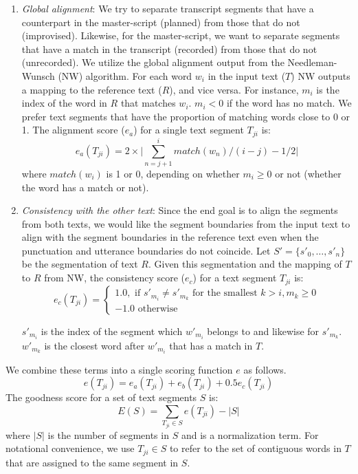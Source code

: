 \begin{enumerate}
\item{\textit{Global alignment}: We try to separate transcript segments that have a counterpart in the master-script (planned) from those that do not (improvised). Likewise, for the master-script, we want to separate segments that have a match in the transcript (recorded) from those that do not (unrecorded). We utilize the global alignment output from the Needleman-Wunsch (NW) algorithm. For each word $w_i$ in the input text ($T$) NW outputs a mapping 
to the reference text ($R$), and vice versa. For instance, $m_i$ is the index of the word in  $R$ that matches $w_i$. $m_i < 0$ if the word has no match. We prefer text segments that have the proportion of matching words close to 0 or 1. The alignment score ($e_a$) for a single text segment $T_{ji}$ is:  
\begin{equation}
e_{a}(T_{ji}) = 2\times\bigg|\sum_{n=j+1}^{i}{match(w_n)}\big/(i-j) - 1/2 \bigg|
\end{equation}
where $match(w_i)$ is 1 or 0, depending on whether $m_i \geq 0$ or not (whether the word has a match or not).
}
\item{\textit{Consistency with the other text}: Since the end goal is to align the segments from both texts, we would like the segment boundaries from the input text to align with the segment boundaries in the reference text even when the punctuation and utterance boundaries do not coincide. Let $S' = \{s'_0, \dots, s'_n\}$ be the segmentation of text $R$. Given this segmentation and the mapping of $T$ to $R$ from NW, the consistency score ($e_c$) for a text segment $T_{ji}$ is:
\begin{equation}
    e_c(T_{ji})= 
\begin{cases}
   1.0, \text{ if } s'_{m_i} \neq s'_{m_k} \text{ for the smallest } k>i, m_k \geq0\\
   -1.0 \text{ otherwise }
\end{cases}
\end{equation}

$s'_{m_i}$ is the index of the segment which $w'_{m_i}$ belongs to and likewise for $s'_{m_k}$. $w'_{m_k}$ is the closest word after $w'_{m_i}$ that has a match in $T$.
} 
\end{enumerate}

We combine these terms into a single scoring function $e$ as follows. 
\begin{equation}
e(T_{ji}) = e_a(T_{ji}) + e_b(T_{ji}) + 0.5  e_c(T_{ji})
\end{equation}
The goodness score for a set of text segments $S$ is:
\begin{equation}
E(S) = \sum_{T_{ji}\in S}{e(T_{ji})} - \big|S\big|
\end{equation}
where $\big|S\big|$ is the number of segments in $S$ and is a normalization term. For notational convenience, we use $T_{ji}\in S$ to refer to the set of contiguous words in $T$ that are assigned to the same segment in $S$. \\ 

